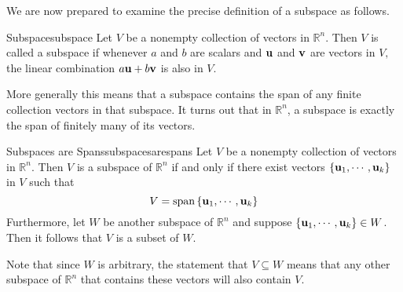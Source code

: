 We are now prepared to examine the precise definition of a subspace as follows.

\begin{definition}{Subspace}{subspace}
Let $V$ be a nonempty collection of vectors in $\mathbb{R}^{n}.$ Then
$V$ is called a subspace  if whenever $a$ and $b$  are scalars and ${\bf u}$ and ${\bf v}$
are vectors in $V,$ the linear combination $a {\bf u}+ b {\bf v}$ is also in $V$.
\end{definition}

More generally this means that a subspace contains the span of any
finite collection vectors in that subspace. It turns out that in
$\mathbb{R}^{n}$, a subspace is exactly the span of finitely many of
its vectors.

\begin{theorem}{Subspaces are Spans}{subspacesarespans}
Let $V$ be a nonempty collection of vectors in $\mathbb{R}^{n}.$ Then $V$ is a subspace of $\mathbb{R}^{n}$ if and only if there
exist vectors $\left\{ {\bf u}_{1},\cdots ,{\bf u}_{k}\right\}$ in $V$ such that 
\[
V= \mbox{span}\left\{ {\bf u}_{1},\cdots ,{\bf u}_{k}\right\} 
\]
Furthermore, let $W$ be another subspace of $\mathbb{R}^n$ and suppose $\left\{ {\bf u}_{1},\cdots ,{\bf u}_{k}\right\} \in W$. Then it follows that $V$ is a subset of $W$. 
\end{theorem}

Note that since $W$ is arbitrary, the statement that $V \subseteq W$ means that any other subspace of $\mathbb{R}^n$ that contains these vectors will also contain $V$. 

